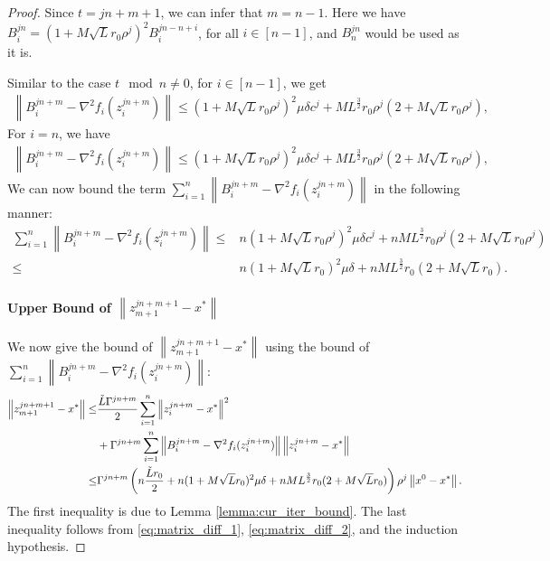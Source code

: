 \documentclass[letterpaper]{article} %
\theoremstyle{plain}
\theoremstyle{definition}
\theoremstyle{remark}
\newcommand\norm[1]{\left\lVert#1\right\rVert}
\begin{document}
\begin{proof}
    Since $t = j n + m + 1$, we can infer that $m = n -1$. Here we have $B_{i}^{j n} = (1 + M \sqrt{L} r_0 \rho^j)^2 B_i^{j n - n + i}$, for all $i \in [n-1]$, and $B_n^{jn}$ would be used as it is.

    Similar to the case $t \mod n \neq 0$, for $i \in [n - 1]$, we get
    \begin{align*}
        \norm{B_i^{j n + m} - \nabla^2 f_i(z_i^{j n + m})} \leq (1 + M \sqrt{L} r_0 \rho^j)^2 \mu \delta c^j + M L^{\frac{3}{2}} r_0 \rho^j (2 + M \sqrt{L} r_0 \rho^j), 
    \end{align*}
    For $i=n$, we have
     \begin{align*}
        \norm{B_i^{j n + m} - \nabla^2 f_i(z_i^{j n + m})} \leq (1 + M \sqrt{L} r_0 \rho^j)^2 \mu \delta c^j + M L^{\frac{3}{2}} r_0 \rho^j (2 + M \sqrt{L} r_0 \rho^j), 
    \end{align*}
    We can now bound the term $\sum_{i=1}^n \norm{B_{i}^{j n + m} - \nabla^2 f_i (z_i^{j n + m})}$ in the following manner:
    \begin{equation}
    \begin{split}
        \sum_{i=1}^n \norm{B_{i}^{j n + m} - \nabla^2 f_i (z_i^{j n + m})} \leq & n (1 + M \sqrt{L} r_0 \rho^j)^2 \mu \delta c^j + n M L^{\frac{3}{2}} r_0 \rho^j (2 + M \sqrt{L} r_0 \rho^j) \\
        \leq & n (1 + M \sqrt{L} r_0 )^2 \mu \delta  + n M L^{\frac{3}{2}} r_0  (2 + M \sqrt{L} r_0 ).
    \end{split}
    \label{eq:matrix_diff_2}
    \end{equation}
    \paragraph{Upper Bound of $\norm{z_{m+1}^{j n + m + 1} - x^ * }$} 
    We now give the bound of $\norm{z_{m+1}^{j n + m + 1} - x^ * }$ using the bound of $\sum_{i=1}^n \norm{B_i^{j n + m} - \nabla^2 f_i (z_i^{j n + m})}$:
    \begin{align*}
        \norm{z_{m+1}^{j n + m + 1} - x^*} \leq &\frac{\Tilde{L} \Gamma^{j n + m}}{2} \sum_{i=1}^n \norm{z_i^{j n + m} - x^*}^2 \\
        & + \Gamma^{j n + m} \sum_{i=1}^n \norm{B_i^{j n + m} - \nabla^2 f_i (z_i^{j n + m})} \norm{z_i^{j n + m} - x^*} \\
        \leq & \Gamma^{j n + m}\left( n \frac{\Tilde{L} r_0 }{ 2} + n (1 + M \sqrt{L} r_0 )^2 \mu \delta  + n M L^{\frac{3}{2}} r_0  (2 + M \sqrt{L} r_0 ) \right) \rho^j \norm{x^0 - x^*}.
    \end{align*}
    The first inequality is due to Lemma \ref{lemma:cur_iter_bound}. The last inequality follows from \eqref{eq:matrix_diff_1}, \eqref{eq:matrix_diff_2}, and the induction hypothesis.


\end{proof}
\end{document}
